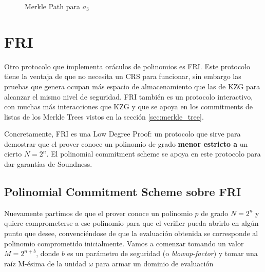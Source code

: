 \begin{figure}
\centering
{}
\caption{Merkle Path para $a_3$}
\label{fig:merkle_path}
\end{figure}

\section{FRI}
Otro protocolo que implementa oráculos de polinomios es FRI\cite{ben2018fast}. Este protocolo tiene la ventaja de que no necesita un CRS para funcionar, sin embargo las pruebas que genera ocupan más espacio de almacenamiento que las de KZG para alcanzar el mismo nivel de seguridad. FRI también es un protocolo interactivo, con muchas más interacciones que KZG y que se apoya en los commitments de listas de los Merkle Trees vistos en la sección \ref{sec:merkle_tree}.

Concretamente, FRI es una Low Degree Proof: un protocolo que sirve para demostrar que el prover conoce un polinomio de grado \textbf{menor estricto a} un cierto $N = 2^n$. El polinomial commitment scheme se apoya en este protocolo para dar garantías de Soundness. 

\subsection{Polinomial Commitment Scheme sobre FRI}
Nuevamente partimos de que el prover conoce un polinomio $p$ de grado $N = 2^n$ y quiere comprometerse a ese polinomio para que el verifier pueda abrirlo en algún punto que desee, convenciéndose de que la evaluación obtenida se corresponde al polinomio comprometido inicialmente. Vamos a comenzar tomando un valor $M = 2^{n+b}$, donde $b$ es un parámetro de seguridad (o \textit{blowup-factor}) y tomar una raíz M-ésima de la unidad $\omega$ para armar un dominio de evaluación

